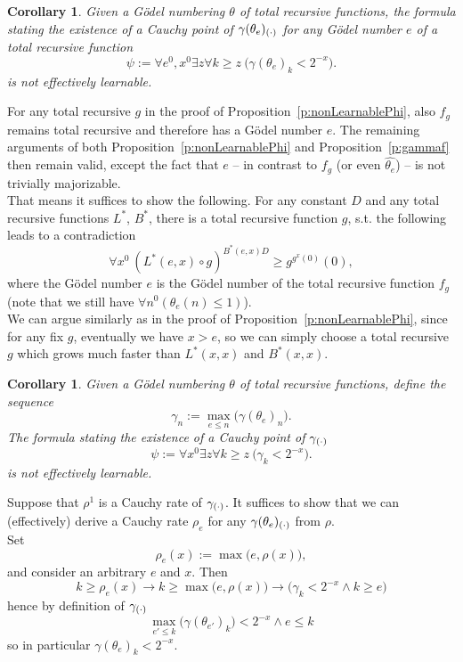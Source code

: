 \documentclass[1p]{elsarticle}
\theoremstyle{plain}
\newtheorem{cor}[thm]{Corollary}
\theoremstyle{definition}
\theoremstyle{remark}
\renewenvironment{proof}[1][]{\noindent{\bf Proof{#1}. }}{\nopagebreak[4]{\hspace*{\fill}
  $\Box$              %
 }{\vspace{2ex}}}
\theoremstyle{definition}
\begin{document}
{\begin{cor}\label{c:gammae}
Given a G\"odel numbering $\theta$ of total recursive functions, 
the formula stating the existence of a Cauchy point of $\gamma(\theta_e)_{(\cdot)}$ for any G\"odel number $e$ of a total recursive function 
\[
\psi:=\forall e^0,x^0\exists z \forall k\geq z\ \big( \gamma(\theta_e)_k<2^{-x} \big).
\]
is not effectively learnable.
\end{cor}

\begin{proof}
For any total recursive $g$ in the proof of Proposition~\ref{p:nonLearnablePhi}, also $f_g$ remains total recursive and therefore
has a G\"odel number $e$. The remaining arguments of both Proposition~\ref{p:nonLearnablePhi} and Proposition~\ref{p:gammaf} then remain valid,
except the fact that $e$ -- in contrast to $f_g$ (or even $\widehat{\theta_e}$) -- is not trivially majorizable.\\ 
That means it suffices to show the following. 
For any constant $D$ and any total recursive functions $L^*$, $B^*$, there is a total recursive function $g$, s.t. the following leads to a contradiction
\[ \forall x^0\ (L^*(e,x)\circ g)^{B^*(e,x)D}\geq g^{g^{x}(0)}(0),\]
where the G\"odel number $e$ is the G\"odel number of the total recursive function $f_g$ (note that we still have $\forall n^0 (\theta_e(n)\leq1)$).\\
We can argue similarly as in the proof of Proposition~\ref{p:nonLearnablePhi}, since for any fix $g$, eventually we have $x>e$, so we can simply choose
a total recursive $g$ which grows much faster than $L^*(x,x)$ and $B^*(x,x)$.
\end{proof}

\begin{cor}\label{c:gammaee}
Given a G\"odel numbering $\theta$ of total recursive functions, define the sequence
\[
\gamma_n := \max_{e\leq n} \big( \gamma(\theta_e)_n\big).
\]
The formula stating the existence of a Cauchy point of $\gamma_{(\cdot)}$
\[
\psi:=\forall x^0\exists z \forall k\geq z\ \big( \gamma_k<2^{-x} \big).
\]
is not effectively learnable.
\end{cor}
\begin{proof}
Suppose that $\rho^1$ is a Cauchy rate of $\gamma_{(\cdot)}$. It suffices to show that we can (effectively) derive a Cauchy rate $\rho_e$ for
any $\gamma(\theta_e)_{(\cdot)}$ from $\rho$.\\
Set \[\rho_e(x):=\max\big(e,\rho(x)\big),\]
and consider an arbitrary $e$ and $x$. Then
\[
k\geq\rho_e(x)\rightarrow k\geq\max\big(e,\rho(x)\big) \rightarrow \big(\gamma_k<2^{-x} \wedge k\geq e\big) 
\]
hence by definition of $\gamma_{(\cdot)}$
\[
\max_{e'\leq k} \big( \gamma(\theta_{e'})_k\big)<2^{-x} \wedge e\leq k
\]
so in particular $\gamma(\theta_{e})_k<2^{-x}$.
\end{proof}

}
\end{document}

